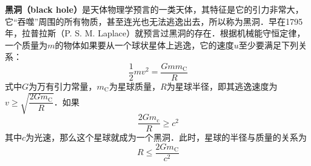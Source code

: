 

\textbf{黑洞（black hole）}是天体物理学预言的一类天体，其特征是它的引力非常大，它“吞噬”周围的所有物质，甚至连光也无法逃逸出去，所以称为黑洞．早在1795 年，拉普拉斯（P. S. M. Laplace）就预言过黑洞的存在．根据机械能守恒定律，一个质量为$m$的物体如果要从一个球状星体上逃逸，它的速度$u $至少要满足下列关系：
\begin{equation}
\frac{1}{2} m v^{2}=\frac{G m m_{\mathrm{C}}}{R}
\end{equation}
式中$G $为万有引力常量，$ m_{\mathrm{C}}$为星球质量，$ R $为星球半径，即其逃逸速度为$v \geqslant \sqrt{\dfrac{2 G m_{\mathrm{C}}}{R}}$．如果
\begin{equation}
\frac{2 G m_{\mathrm{c}}}{R} \geqslant c^{2}
\end{equation}
其中$c$为光速，那么这个星球就成为一个黑洞．此时，星球的半径与质量的关系为
\begin{equation}
R \leqslant \frac{2 G m_{\mathrm{C}}}{c^{2}}
\end{equation}